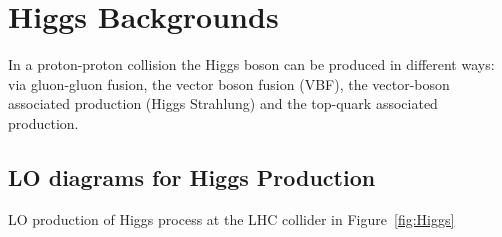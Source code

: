 \section{Higgs Backgrounds}
\label{SectionHiggs}
In a proton-proton collision the Higgs boson can be produced in different ways:
via gluon-gluon fusion, the vector boson fusion (VBF), the vector-boson associated
production (Higgs Strahlung) and the top-quark associated production.

\subsection{LO diagrams for Higgs Production} 
LO production of Higgs process at the LHC collider in Figure~\ref{fig:Higgs}
\vspace{5mm}

